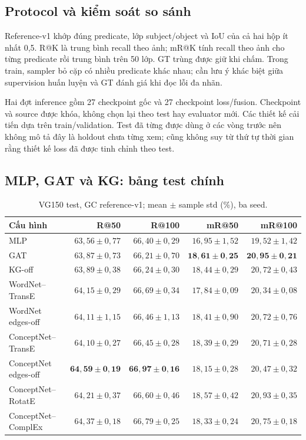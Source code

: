 \subsection{Protocol và kiểm soát so sánh}
Reference-v1 khớp đúng predicate, lớp subject/object và IoU của cả hai hộp
ít nhất 0,5. R@K là trung bình recall theo ảnh; mR@K tính recall theo ảnh
cho từng predicate rồi trung bình trên 50 lớp. GT trùng được giữ khi chấm.
Trong train, sampler bỏ cặp có nhiều predicate khác nhau; cần lưu ý khác biệt
giữa supervision huấn luyện và GT đánh giá khi đọc lỗi đa nhãn.

Hai đợt inference gồm 27 checkpoint gốc và 27 checkpoint loss/fusion.
Checkpoint và source được khóa, không chọn lại theo test hay evaluator mới.
Các thiết kế cải tiến dựa trên train/validation. Test đã từng được dùng ở các
vòng trước nên không mô tả đây là holdout chưa từng xem; cũng không suy từ
thứ tự thời gian rằng thiết kế loss đã được tinh chỉnh theo test.


\subsection{MLP, GAT và KG: bảng test chính}
\begin{table}[!t]\centering\small
\caption{VG150 test, GC reference-v1; mean $\pm$ sample std (\%), ba seed.}\label{tab:vgmain}
\begin{tabular}{@{}lrrrr@{}}\toprule
Cấu hình & R@50 & R@100 & mR@50 & mR@100\\\midrule
MLP & $63,56\pm0,77$ & $66,40\pm0,29$ & $16,95\pm1,52$ & $19,52\pm1,42$\\
GAT & $63,87\pm0,73$ & $66,21\pm0,70$ & $\mathbf{18,61\pm0,25}$ & $\mathbf{20,95\pm0,21}$\\
KG-off & $63,89\pm0,38$ & $66,24\pm0,30$ & $18,44\pm0,29$ & $20,72\pm0,43$\\
WordNet--TransE & $64,15\pm0,29$ & $66,69\pm0,34$ & $17,84\pm0,09$ & $20,34\pm0,08$\\
WordNet edges-off & $64,11\pm1,15$ & $66,46\pm1,13$ & $18,41\pm0,90$ & $20,72\pm0,76$\\
ConceptNet--TransE & $64,10\pm0,27$ & $66,45\pm0,28$ & $18,39\pm0,29$ & $20,71\pm0,28$\\
ConceptNet edges-off & $\mathbf{64,59\pm0,19}$ & $\mathbf{66,97\pm0,16}$ & $18,15\pm0,28$ & $20,47\pm0,32$\\
ConceptNet--RotatE & $64,21\pm0,37$ & $66,60\pm0,46$ & $18,57\pm0,42$ & $20,93\pm0,35$\\
ConceptNet--ComplEx & $64,37\pm0,18$ & $66,79\pm0,25$ & $18,33\pm0,24$ & $20,75\pm0,18$\\
\bottomrule\end{tabular}\end{table}

